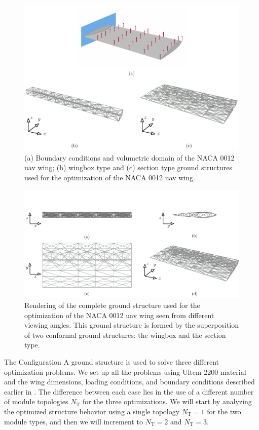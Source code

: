 \begin{figure}
    \centering
    \includegraphics[width=\linewidth]{figures/07_aeronautic/00_NACA_a_gs_cell/gs_a_types.pdf}
     \caption{(a) Boundary conditions and volumetric domain of the NACA 0012 \gls{uav} wing; (b) wingbox type and (c) section type ground structures used for the optimization of the NACA 0012 \gls{uav} wing.}
    \label{fig:07_gs_a_types}
\end{figure}

\begin{figure}
    \centering
    \includegraphics[width=\linewidth]{figures/07_aeronautic/00_NACA_gs/gs_a.pdf}
     \caption{Rendering of the complete ground structure used for the optimization of the NACA 0012 \gls{uav} wing seen from different viewing angles. This ground structure is formed by the superposition of two conformal ground structures: the wingbox and the section type.}
    \label{fig:07_gs_a}
\end{figure}

The Configuration A ground structure is used to solve three different optimization problems. We set up all the problems using Ultem 2200 material and the wing dimensions, loading conditions, and boundary conditions described earlier in . The difference between each case lies in the use of a different number of module topologies $N_\text{T}$ for the three optimizations. We will start by analyzing the optimized structure behavior using a single topology $N_\text{T}=1$ for the two module types, and then we will increment to $N_\text{T}=2$ and $N_\text{T}=3$.

